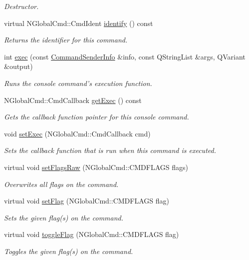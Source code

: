 \begin{DoxyCompactItemize}
\begin{DoxyCompactList}\small\item\em Destructor. \end{DoxyCompactList}\item 
virtual N\-Global\-Cmd\-::\-Cmd\-Ident \hyperlink{class_con_command_ab287443a9615df46739d0c39b096016e}{identify} () const 
\begin{DoxyCompactList}\small\item\em Returns the identifier for this command. \end{DoxyCompactList}\item 
int \hyperlink{class_con_command_af6d7e9c4e0b654f0b3e9a34cb5b22179}{exec} (const \hyperlink{class_command_sender_info}{Command\-Sender\-Info} \&info, const Q\-String\-List \&args, Q\-Variant \&output)
\begin{DoxyCompactList}\small\item\em Runs the console command's execution function. \end{DoxyCompactList}\item 
N\-Global\-Cmd\-::\-Cmd\-Callback \hyperlink{class_con_command_a7ff5a03d8a8a6ab7badaef4ffd083714}{get\-Exec} () const 
\begin{DoxyCompactList}\small\item\em Gets the callback function pointer for this console command. \end{DoxyCompactList}\item 
void \hyperlink{class_con_command_a3ae23385874e68d3e72ef50d0baf2ade}{set\-Exec} (N\-Global\-Cmd\-::\-Cmd\-Callback cmd)
\begin{DoxyCompactList}\small\item\em Sets the callback function that is run when this command is executed. \end{DoxyCompactList}\item 
virtual void \hyperlink{class_con_command_a87828b1909270309d2005a03ca2cd413}{set\-Flags\-Raw} (N\-Global\-Cmd\-::\-C\-M\-D\-F\-L\-A\-G\-S flags)
\begin{DoxyCompactList}\small\item\em Overwrites all flags on the command. \end{DoxyCompactList}\item 
virtual void \hyperlink{class_con_command_a7004e0c6eb421e5dfb90bd633e85bf14}{set\-Flag} (N\-Global\-Cmd\-::\-C\-M\-D\-F\-L\-A\-G\-S flag)
\begin{DoxyCompactList}\small\item\em Sets the given flag(s) on the command. \end{DoxyCompactList}\item 
virtual void \hyperlink{class_con_command_ab2591a1c31847e9746520e9958ba0f9a}{toggle\-Flag} (N\-Global\-Cmd\-::\-C\-M\-D\-F\-L\-A\-G\-S flag)
\begin{DoxyCompactList}\small\item\em Toggles the given flag(s) on the command. \end{DoxyCompactList}\end{DoxyCompactItemize}
